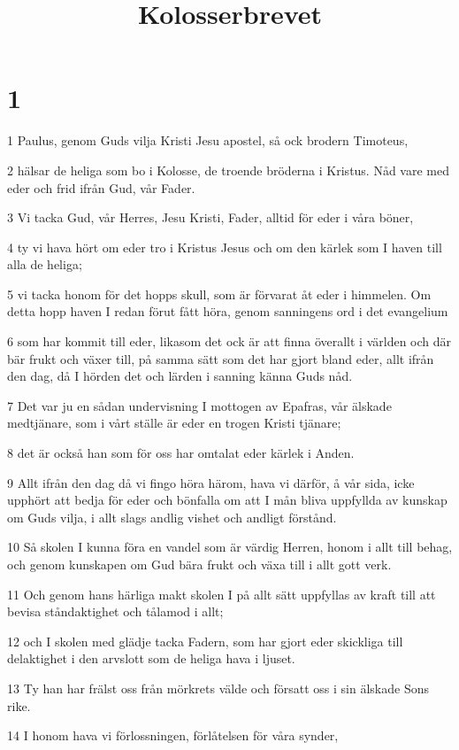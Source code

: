 

\title{Kolosserbrevet}


\chapter{1}

\par 1 Paulus, genom Guds vilja Kristi Jesu apostel, så ock brodern Timoteus,
\par 2 hälsar de heliga som bo i Kolosse, de troende bröderna i Kristus. Nåd vare med eder och frid ifrån Gud, vår Fader.
\par 3 Vi tacka Gud, vår Herres, Jesu Kristi, Fader, alltid för eder i våra böner,
\par 4 ty vi hava hört om eder tro i Kristus Jesus och om den kärlek som I haven till alla de heliga;
\par 5 vi tacka honom för det hopps skull, som är förvarat åt eder i himmelen. Om detta hopp haven I redan förut fått höra, genom sanningens ord i det evangelium
\par 6 som har kommit till eder, likasom det ock är att finna överallt i världen och där bär frukt och växer till, på samma sätt som det har gjort bland eder, allt ifrån den dag, då I hörden det och lärden i sanning känna Guds nåd.
\par 7 Det var ju en sådan undervisning I mottogen av Epafras, vår älskade medtjänare, som i vårt ställe är eder en trogen Kristi tjänare;
\par 8 det är också han som för oss har omtalat eder kärlek i Anden.
\par 9 Allt ifrån den dag då vi fingo höra härom, hava vi därför, å vår sida, icke upphört att bedja för eder och bönfalla om att I mån bliva uppfyllda av kunskap om Guds vilja, i allt slags andlig vishet och andligt förstånd.
\par 10 Så skolen I kunna föra en vandel som är värdig Herren, honom i allt till behag, och genom kunskapen om Gud bära frukt och växa till i allt gott verk.
\par 11 Och genom hans härliga makt skolen I på allt sätt uppfyllas av kraft till att bevisa ståndaktighet och tålamod i allt;
\par 12 och I skolen med glädje tacka Fadern, som har gjort eder skickliga till delaktighet i den arvslott som de heliga hava i ljuset.
\par 13 Ty han har frälst oss från mörkrets välde och försatt oss i sin älskade Sons rike.
\par 14 I honom hava vi förlossningen, förlåtelsen för våra synder,
